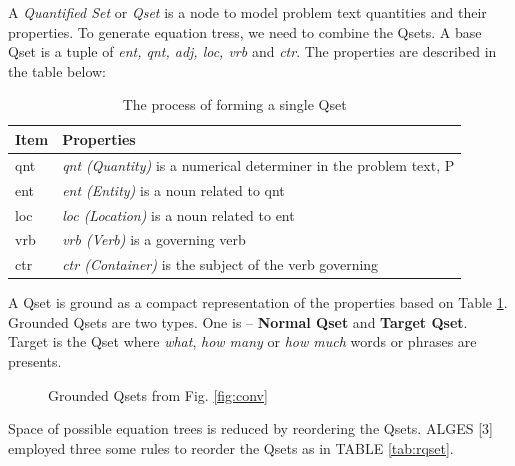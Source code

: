 \documentclass[document.tex]{subfiles}
\begin{document}
A \textit{Quantified Set} or \textit{Qset} is a node to model problem text quantities and their properties. To generate equation tress, we need to combine the Qsets. A base Qset is a tuple of \textit{ent, qnt, adj, loc, vrb} and \textit{ctr}. The properties are described in the table below:
\begin{table}[H]
	\caption{The process of forming a single Qset\cite{3}}
	\begin{center}
		\begin{tabular}{|l|l|}\hline
			Item & Properties          \\ \hline
			qnt  & \textit{qnt (Quantity)} is a numerical determiner in the problem text, P \\ \hline
			
			ent  & \textit{ent (Entity)} is a noun related to qnt \\ \hline
			loc  & \textit{loc (Location)} is a noun related to ent \\ \hline
			vrb  & \textit{vrb (Verb)} is a governing verb \\ \hline
			ctr  & \textit{ctr (Container)} is the subject of the verb governing \\ \hline
		\end{tabular}
	\end{center}
	\label{tab:qset}
\end{table}
A Qset is ground as a compact representation of the properties based on Table \ref{tab:qset}. Grounded Qsets are two types. One is – \textbf{Normal Qset} and \textbf{Target Qset}. Target is the Qset where \textit{what}, \textit{how many} or \textit{how much} words or phrases are presents.

\begin{figure}[H]
	\caption{Grounded Qsets from Fig. \ref{fig:conv}}
	\label{fig:groundedQset}
\end{figure}
\noindent Space of possible equation trees is reduced by reordering the Qsets. ALGES [3] employed three some rules to reorder the Qsets as in TABLE \ref{tab:rqset}.
\end{document}
